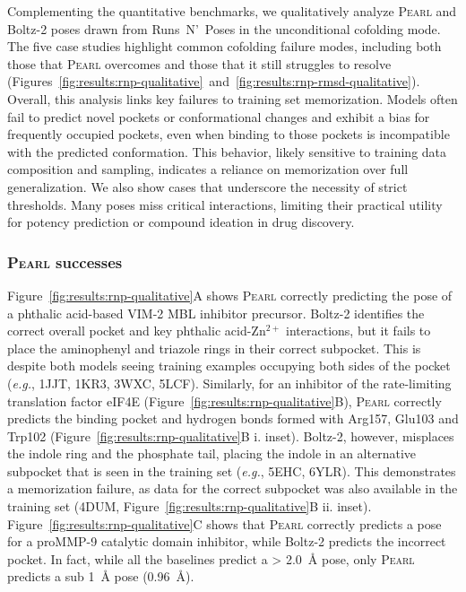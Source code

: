 \documentclass[11pt, letterpaper, onecolumn]{tau-class/tau}
\newcommand{\pearl}{\textsc{Pearl}\xspace}
\newcommand{\boltz}[1]{\mbox{Boltz-#1\xspace}}
\newcommand{\rmsdonea}{\text{RMSD\,\raisebox{0.25ex}{\scriptsize <}\,1\,\AA}\xspace}
\newcommand{\rmsdtwoa}{\text{RMSD\,\raisebox{0.25ex}{\scriptsize <}\,2\,\AA}\xspace}
\newcommand{\lttwoa}{\text{\raisebox{0.25ex}{\scriptsize <}\,2\,\AA}\xspace}
\newcommand{\runsnposes}{Runs~N'~Poses\xspace}
\newcommand{\eg}{\textit{e.g.}\xspace}
\let\oldAA\AA
\renewcommand{\AA}{\oldAA\xspace}
\begin{document}
Complementing the quantitative benchmarks, we qualitatively analyze \pearl and \boltz2 poses drawn from \runsnposes in the unconditional cofolding mode.
The five case studies highlight common cofolding failure modes, including both those that \pearl overcomes and those that it still struggles to resolve (Figures~\ref{fig:results:rnp-qualitative}~and~\ref{fig:results:rnp-rmsd-qualitative}). 
Overall, this analysis links key failures to training set memorization.
Models often fail to predict novel pockets or conformational changes and exhibit a bias for frequently occupied pockets, even when binding to those pockets is incompatible with the predicted conformation.
This behavior, likely sensitive to training data composition and sampling, indicates a reliance on memorization over full generalization. We also show cases that underscore the necessity of strict \rmsdonea thresholds.
Many \rmsdtwoa poses miss critical interactions, limiting their practical utility for potency prediction or compound ideation in drug discovery.

\subsubsection{\pearl successes}
Figure~\ref{fig:results:rnp-qualitative}A shows \pearl correctly predicting the pose of a phthalic acid-based VIM-2 MBL inhibitor precursor.
\boltz2 identifies the correct overall pocket and key phthalic acid-Zn$^{2+}$ interactions, but it fails to place the aminophenyl and triazole rings in their correct subpocket.
This is despite both models seeing training examples occupying both sides of the pocket (\eg, 1JJT, 1KR3, 3WXC, 5LCF).
Similarly, for an inhibitor of the rate-limiting translation factor eIF4E  (Figure~\ref{fig:results:rnp-qualitative}B), \pearl correctly predicts the binding pocket and hydrogen bonds formed with Arg157, Glu103 and Trp102 (Figure~\ref{fig:results:rnp-qualitative}B i. inset).
\boltz2, however, misplaces the indole ring and the phosphate tail, placing the indole in an alternative subpocket that is seen in the training set (\eg, 5EHC, 6YLR).
This demonstrates a memorization failure, as data for the correct subpocket was also available in the training set (4DUM, Figure~\ref{fig:results:rnp-qualitative}B ii. inset).
Figure~\ref{fig:results:rnp-qualitative}C shows that \pearl correctly predicts a \lttwoa pose for a proMMP-9 catalytic domain inhibitor, while \boltz2 predicts the incorrect pocket. In fact, while all the baselines predict a > 2.0~\AA pose, only \pearl predicts a sub 1~\AA pose (0.96~\AA).
\end{document}
